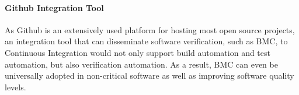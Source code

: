\paragraph{Github Integration Tool} As Github is an extensively used platform for hosting most open source projects, an integration tool that can disseminate software verification, such as BMC, to Continuous Integration would not only support build automation and test automation, but also verification automation. As a result, BMC can even be universally adopted in non-critical software as well as improving software quality levels.







